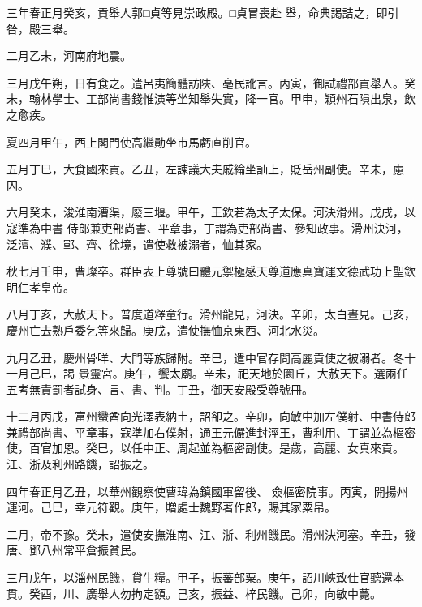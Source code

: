 \begin{pinyinscope}
 三年春正月癸亥，貢舉人郭□貞等見崇政殿。□貞冒喪赴
 舉，命典謁詰之，即引咎，殿三舉。



 二月乙未，河南府地震。



 三月戊午朔，日有食之。遣呂夷簡體訪陜、亳民訛言。丙寅，御試禮部貢舉人。癸未，翰林學士、工部尚書錢惟演等坐知舉失實，降一官。甲申，穎州石隕出泉，飲之愈疾。



 夏四月甲午，西上閣門使高繼勛坐市馬虧直削官。



 五月丁巳，大食國來貢。乙丑，左諫議大夫戚綸坐訕上，貶岳州副使。辛未，慮囚。



 六月癸未，浚淮南漕渠，廢三堰。甲午，王欽若為太子太保。河決滑州。戊戌，以寇準為中書
 侍郎兼吏部尚書、平章事，丁謂為吏部尚書、參知政事。滑州決河，泛澶、濮、鄆、齊、徐境，遣使救被溺者，恤其家。



 秋七月壬申，曹璨卒。群臣表上尊號曰體元禦極感天尊道應真寶運文德武功上聖欽明仁孝皇帝。



 八月丁亥，大赦天下。普度道釋童行。滑州龍見，河決。辛卯，太白晝見。己亥，慶州亡去熟戶委乞等來歸。庚戌，遣使撫恤京東西、河北水災。



 九月乙丑，慶州骨咩、大門等族歸附。辛巳，遣中官存問高麗貢使之被溺者。冬十一月己巳，謁
 景靈宮。庚午，饗太廟。辛未，祀天地於圜丘，大赦天下。選兩任五考無責罰者試身、言、書、判。丁丑，御天安殿受尊號冊。



 十二月丙戌，富州蠻酋向光澤表納土，詔卻之。辛卯，向敏中加左僕射、中書侍郎兼禮部尚書、平章事，寇準加右僕射，通王元儼進封涇王，曹利用、丁謂並為樞密使，百官加恩。癸巳，以任中正、周起並為樞密副使。是歲，高麗、女真來貢。江、浙及利州路饑，詔振之。



 四年春正月乙丑，以華州觀察使曹瑋為鎮國軍留後、
 僉樞密院事。丙寅，開揚州運河。己巳，幸元符觀。庚午，贈處士魏野著作郎，賜其家粟帛。



 二月，帝不豫。癸未，遣使安撫淮南、江、浙、利州饑民。滑州決河塞。辛丑，發唐、鄧八州常平倉振貧民。



 三月戊午，以淄州民饑，貸牛糧。甲子，振蕃部粟。庚午，詔川峽致仕官聽還本貫。癸酉，川、廣舉人勿拘定額。己亥，振益、梓民饑。己卯，向敏中薨。




\end{pinyinscope}
